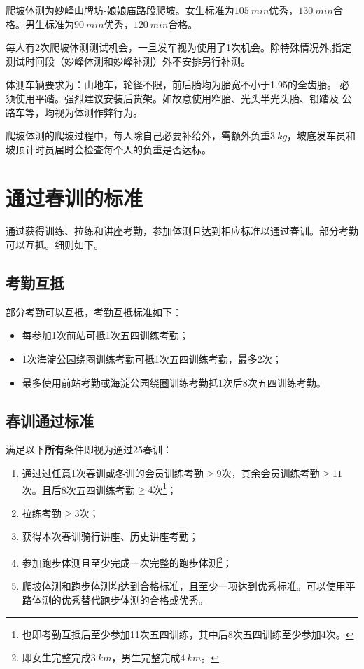\documentclass[UTF8]{ctexart}
\begin{document}
爬坡体测为妙峰山牌坊-娘娘庙路段爬坡。女生标准为$\SI{105}{min}$优秀，$\SI{130}{min}$合格。男生标准为$\SI{90}{min}$优秀，$\SI{120}{min}$合格。

每人有2次爬坡体测测试机会，一旦发车视为使用了1次机会。除特殊情况外,指定测试时间段（妙峰体测和妙峰补测）外不安排另行补测。

体测车辆要求为：山地车，轮径不限，前后胎均为胎宽不小于1.95的全齿胎。
必须使用平踏。强烈建议安装后货架。如故意使用窄胎、光头半光头胎、锁踏及
公路车等，均视为体测作弊行为。

爬坡体测的爬坡过程中，每人除自己必要补给外，需额外负重$\SI{3}{kg}$，坡底发车员和坡顶计时员届时会检查每个人的负重是否达标。

\section{通过春训的标准}

通过获得训练、拉练和讲座考勤，参加体测且达到相应标准以通过春训。部分考勤可以互抵。细则如下。

\subsection{考勤互抵}

部分考勤可以互抵，考勤互抵标准如下：

\begin{itemize}[nosep,left=4em]
    \item 每参加1次前站可抵1次五四训练考勤；
    \item 1次海淀公园绕圈训练考勤可抵1次五四训练考勤，最多2次；
    \item 最多使用前站考勤或海淀公园绕圈训练考勤抵1次后8次五四训练考勤。 
\end{itemize}


\subsection{春训通过标准}

满足以下\textbf{所有}条件即视为通过25春训：
\begin{enumerate}[nosep,left=4em]
    \item 通过过任意1次春训或冬训的会员训练考勤$\ge 9$次，其余会员训练考勤$\ge 11$次。且后8次五四训练考勤$\ge 4$次\footnote{也即考勤互抵后至少参加11次五四训练，其中后8次五四训练至少参加4次。}；
    \item 拉练考勤$\ge 3$次；
    \item 获得本次春训骑行讲座、历史讲座考勤；
    \item 参加跑步体测且至少完成一次完整的跑步体测\footnote{即女生完整完成$\SI{3}{km}$，男生完整完成$\SI{4}{km}$。}；
    \item 爬坡体测和跑步体测均达到合格标准，且至少一项达到优秀标准。可以使用平路体测的优秀替代跑步体测的合格或优秀。
\end{enumerate}
\end{document}
